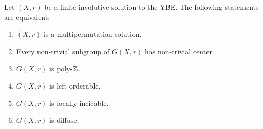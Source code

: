
 \begin{theorem}
\label{thm:BCV}
	Let $(X,r)$ be a finite involutive solution to the YBE. The following statements are equivalent:
	\begin{enumerate}
		\item $(X,r)$ is a multipermutation solution.
		\item Every non-trivial subgroup of $G(X,r)$ has non-trivial center.
		\item $G(X,r)$ is poly-$\mathbb{Z}$.
		\item $G(X,r)$ is left orderable.
		\item $G(X,r)$ is locally incicable.
		\item $G(X,r)$ is diffuse.
	\end{enumerate}
\end{theorem}


